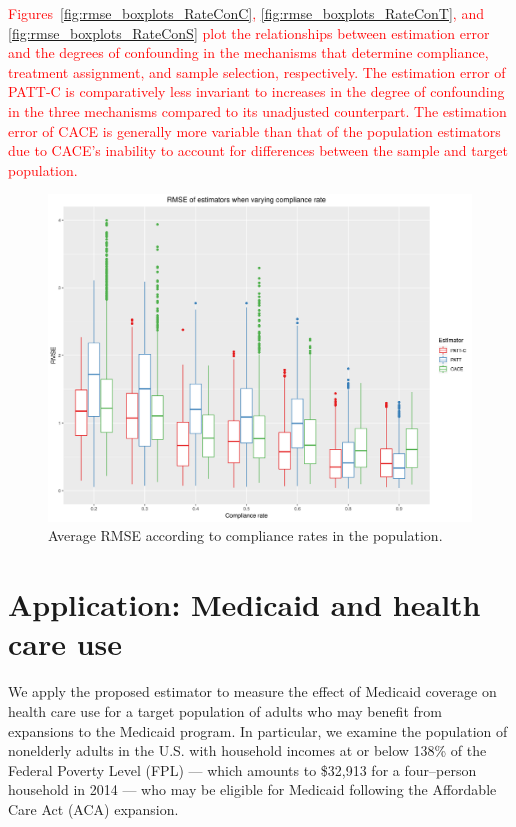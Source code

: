 \documentclass[hidelinks,12pt]{article}
\begin{document}
\textcolor{red}{Figures~\ref{fig:rmse_boxplots_RateConC}, \ref{fig:rmse_boxplots_RateConT}, and \ref{fig:rmse_boxplots_RateConS} plot the relationships between estimation error and the degrees of confounding in the mechanisms that determine compliance, treatment assignment, and sample selection, respectively. The estimation error of PATT-C is comparatively less invariant to increases in the degree of confounding in the three mechanisms compared to its unadjusted counterpart. The estimation error of CACE is generally more variable than that of the population estimators due to CACE's inability to account for differences between the sample and target population.}

\begin{figure}[htbp]
\begin{center}
\includegraphics[width = 1\textwidth]{rmse_boxplots_rateC.png}
\caption{Average RMSE according to compliance rates in the population.\label{fig:rmse_boxplots_rateC}}
\end{center}
\end{figure}

\pagebreak
\section{Application: Medicaid and health care use} \label{application}

We apply the proposed estimator to measure the effect of Medicaid coverage on health care use for a target population of adults who may benefit from expansions to the Medicaid program. In particular, we examine the population of nonelderly adults in the U.S. with household incomes at or below 138\% of the Federal Poverty Level (FPL) --- which amounts to \$32,913 for a four--person household in 2014 --- who may be eligible for Medicaid following the Affordable Care Act (ACA) expansion.
\end{document}
